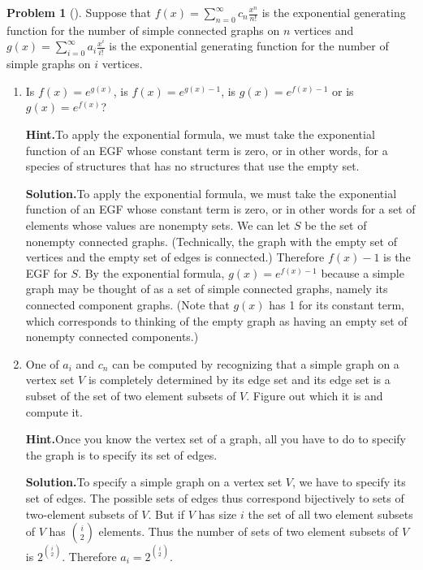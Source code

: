 \documentclass[10pt,]{book}
\theoremstyle{plain}
\theoremstyle{definition}
\newtheorem{activity}[project]{Problem}
\theoremstyle{definition}
\numberwithin{equation}{chapter}
\begin{document}
\begin{activity}[]\label{activity-421}
Suppose that \(f(x) = \sum_{n=0}^\infty c_n \frac{x^n}{n!}\) is the exponential generating function for the number of simple connected graphs on \(n\) vertices and \(g(x) = \sum_{i=0}^\infty a_i \frac{x^i}{i!}\) is the exponential generating function for the number of simple graphs on \(i\) vertices.%
\begin{enumerate}[font=\bfseries,label=(\alph*),ref=\alph*]
\item\label{task-265} Is \(f(x) = e^{g(x)}\), is \(f(x) = e^{g(x)-1}\), is \(g(x) = e^{f(x)-1}\) or is \(g(x) = e^{f(x)}\)?%
\par\medskip\noindent%
\textbf{Hint.}\quad To apply the exponential formula, we must take the exponential function of an EGF whose constant term is zero, or in other words, for a species of structures that has no structures that use the empty set.%
\par\medskip\noindent%
\textbf{Solution.}\quad To apply the exponential formula, we must take the exponential function of an EGF whose constant term is zero, or in other words for a set of elements whose values are nonempty sets. We can let \(S\) be the set of nonempty connected graphs. (Technically, the graph with the empty set of vertices and the empty set of edges is connected.) Therefore \(f(x) -1\) is the EGF for \(S\). By the exponential formula, \(g(x)=e^{f(x)-1}\) because a simple graph may be thought of as a set of simple connected graphs, namely its connected component graphs. (Note that \(g(x)\) has 1 for its constant term, which corresponds to thinking of the empty graph as having an empty set of nonempty connected components.)%
\item\label{task-266} One of \(a_i\) and \(c_n\) can be computed by recognizing that a simple graph on a vertex set \(V\) is completely determined by its edge set and its edge set is a subset of the set of two element subsets of \(V\). Figure out which it is and compute it.%
\par\medskip\noindent%
\textbf{Hint.}\quad Once you know the vertex set of a graph, all you have to do to specify the graph is to specify its set of edges.%
\par\medskip\noindent%
\textbf{Solution.}\quad To specify a simple graph on a vertex set \(V\), we have to specify its set of edges. The possible sets of edges thus correspond bijectively to sets of two-element subsets of \(V\). But if \(V\) has size \(i\) the set of all two element subsets of \(V\) has \(\binom{i}{2}\) elements. Thus the number of sets of two element subsets of \(V\) is \(2^{\binom{i}{2}}\). Therefore \(a_i = 2^{\binom{i}{2}}\).%

\end{enumerate}
\end{activity}
\end{document}
